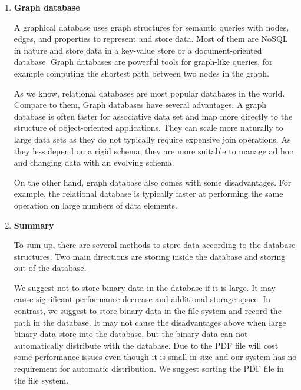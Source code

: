 \begin{enumerate}
	
	\item\textbf{Graph database}
	\setlength{\parindent}{1em}
	
	A graphical database uses graph structures for semantic queries with nodes, edges, and properties to represent and store data. 
	Most of them are NoSQL in nature and store data in a key-value store or a document-oriented database. 
	Graph databases are powerful tools for graph-like queries, for example computing the shortest path between two nodes in the graph.
	
	As we know, relational databases are most popular databases in the world. Compare to them, Graph databases have several advantages. 
	A graph database is often faster for associative data set and map more directly to the structure of object-oriented applications. 
	They can scale more naturally to large data sets as they do not typically require expensive join operations. 
	As they less depend on a rigid schema, they are more suitable to manage ad hoc and changing data with an evolving schema.
	
	On the other hand, graph database also comes with some disadvantages. 
	For example, the relational database is typically faster at performing the same operation on large numbers of data elements.
	
	\item\textbf{Summary}
	\setlength{\parindent}{1em}
	
    To sum up, there are several methods to store data according to the database structures. 
    Two main directions are storing inside the database and storing out of the database.
    
    We suggest not to store binary data in the database if it is large.
    It may cause significant performance decrease and additional storage space.
    In contrast, we suggest to store binary data in the file system and record the path in the database. 
    It may not cause the disadvantages above when large binary data store into the database, but the binary data can not automatically distribute with the database.
    Due to the PDF file will cost some performance issues even though it is small in size and our system has no requirement for automatic distribution.
    We suggest sorting the PDF file in the file system.
	
\end{enumerate}

